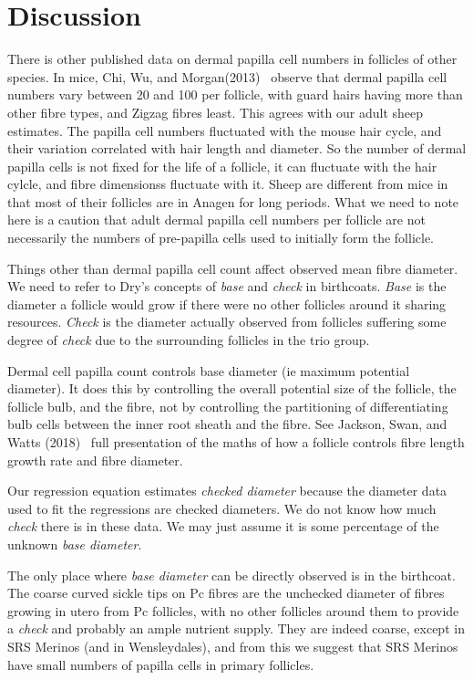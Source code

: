 \documentclass[titlepage]{article}  %
\begin{document}
\section{Discussion}
There is other published data on dermal papilla cell numbers in follicles of other species. In mice, Chi, Wu, and Morgan(2013)~\cite{chi:13} observe that dermal papilla cell numbers vary between 20 and 100 per follicle, with guard hairs having more than other fibre types, and Zigzag fibres least. This agrees with our adult sheep estimates. The papilla cell numbers fluctuated with the mouse hair cycle, and their variation correlated with hair length and diameter. So the number of dermal papilla cells is not fixed for the life of a follicle, it can fluctuate with the hair cylcle, and fibre dimensionss fluctuate with it. Sheep are different from mice in that most of their follicles are in Anagen for long periods.  What we need to note here is a caution that adult dermal papilla cell numbers per follicle are not necessarily the numbers of pre-papilla cells used to initially form the follicle.

Things other than dermal papilla cell count affect observed mean fibre diameter. We need to refer to Dry's concepts of {\em base} and {\em check} in birthcoats. {\em Base} is the diameter a follicle would grow if there were no other follicles around it sharing resources. {\em Check} is the diameter actually observed from follicles suffering some degree of {\em check} due to the surrounding follicles in the trio group. 

Dermal cell papilla count controls base diameter (ie maximum potential diameter). It does this by controlling the overall potential size of the follicle, the follicle bulb, and the fibre, not by controlling the partitioning of differentiating bulb cells between the inner root sheath and the fibre. See Jackson, Swan, and Watts (2018)~\cite{jack:18}  full presentation of the maths of how a follicle controls fibre length growth rate and fibre diameter.

Our regression equation estimates {\em checked diameter} because the diameter data used to fit the regressions are checked diameters. We do not know how much {\em check} there is in these data. We may just  assume it is some percentage of the unknown {\em base diameter}.

The only place where {\em base diameter} can be directly observed is in the birthcoat. The coarse curved sickle tips on Pc fibres are the unchecked diameter of fibres growing in utero from Pc follicles, with no other follicles around them to provide a {\em check} and probably an ample nutrient supply. They are indeed coarse, except in SRS Merinos (and in Wensleydales), and from this we suggest that SRS Merinos have small numbers of papilla cells in primary follicles.  
\end{document}
